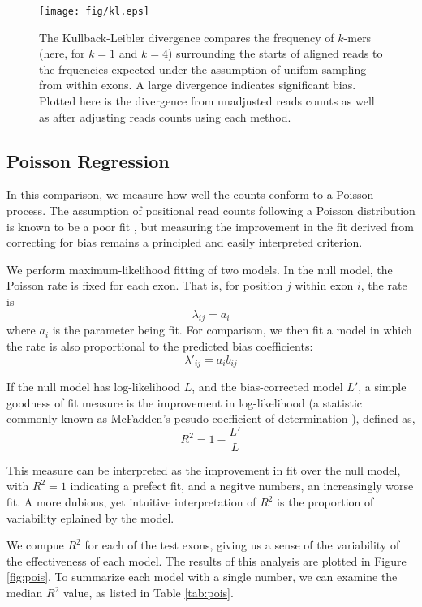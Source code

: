 \documentclass{bioinfo}
\begin{document}
\begin{figure*}
\centerline{\texttt{[image: fig/kl.eps]}}
\caption{The Kullback-Leibler divergence compares the frequency of $k$-mers
(here, for $k = 1$ and $k = 4$) surrounding the starts of aligned reads to the
frquencies expected under the assumption of unifom sampling from within exons.
A large divergence indicates significant bias. Plotted here is the divergence
from unadjusted reads counts as well as after adjusting reads counts using each
method.}
\label{fig:kl}
\end{figure*}


\subsection{Poisson Regression}

In this comparison, we measure how well the counts conform to a Poisson process.
The assumption of positional read counts following a Poisson distribution is
known to be a poor fit \citep{Srivastava2010}, but measuring the improvement in
the fit derived from correcting for bias remains a principled and easily
interpreted criterion.

We perform maximum-likelihood fitting of two models. In the null model, the
Poisson rate is fixed for each exon. That is, for position $j$ within
exon $i$, the rate is
$$ \lambda_{ij} = a_i $$
where $a_i$ is the parameter being fit. For comparison, we then fit a model in
which the rate is also proportional to the predicted bias coefficients:
$$ \lambda'_{ij} = a_i b_{ij} $$

If the null model has log-likelihood $L$, and the bias-corrected model $L'$, a
simple goodness of fit measure is the improvement in log-likelihood (a statistic
commonly known as McFadden's pesudo-coefficient of determination
\citep{McFadden1974}), defined as,
$$R^2 = 1 - \frac{L'}{L}$$

This measure can be interpreted as the improvement in fit over the null model,
with $R^2 = 1$ indicating a prefect fit, and a negitve numbers, an increasingly
worse fit. A more dubious, yet intuitive interpretation of $R^2$ is the
proportion of variability eplained by the model.

We compue $R^2$ for each of the test exons, giving us a sense of the variability
of the effectiveness of each model. The results of this analysis are plotted in
Figure \ref{fig:pois}.  To summarize each model with a single number, we can
examine the median $R^2$ value, as listed in Table \ref{tab:pois}.
\end{document}
